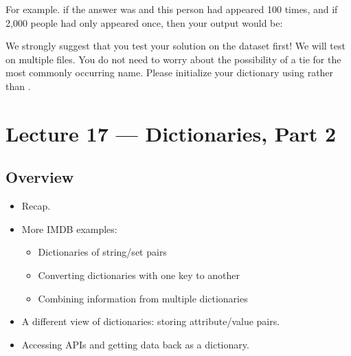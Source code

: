 \documentclass[letterpaper,10pt,english]{sphinxmanual}
\begin{document}
\begin{enumerate}
For example. if the answer was  and this
person had appeared 100 times, and if 2,000 people had only
appeared once, then your output would be:

\begin{sphinxVerbatim}[commandchars=\\\{\}]
        
      
   
\end{sphinxVerbatim}

We strongly suggest that you test your solution on the
 dataset first! We will test on multiple files. You
do not need to worry about the possibility of a tie for the most
commonly occurring name. Please initialize your dictionary using
 rather than \sphinxcode{\sphinxupquote{\{\}}}.

\end{enumerate}


\chapter{Lecture 17 — Dictionaries, Part 2}
\label{\detokenize{lecture_notes/lec17_dictionaries2:lecture-17-dictionaries-part-2}}\label{\detokenize{lecture_notes/lec17_dictionaries2::doc}}

\section{Overview}
\label{\detokenize{lecture_notes/lec17_dictionaries2:overview}}\begin{itemize}
\item {} 
Recap.

\item {} 
More IMDB examples:
\begin{itemize}
\item {} 
Dictionaries of string/set pairs

\item {} 
Converting dictionaries with one key to another

\item {} 
Combining information from multiple dictionaries

\end{itemize}

\item {} 
A different view of dictionaries: storing attribute/value pairs.

\item {} 
Accessing APIs and getting data back as a dictionary.

\end{itemize}
\end{document}
